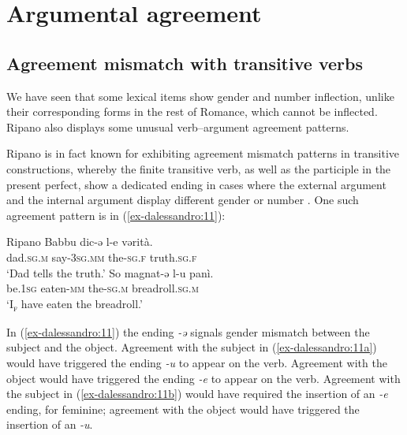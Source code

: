 \documentclass[output=paper
,modfonts
,nonflat]{langsci/langscibook}
\begin{document}
\section{Argumental agreement} \label{sec-dalessandro:2}
\subsection{Agreement mismatch with transitive verbs} \label{sec-dalessandro:2.1}
We have seen that some lexical items show gender and number inflection, unlike their corresponding forms in the rest of Romance, which cannot be inflected. Ripano also displays some unusual verb--argument agreement patterns.

Ripano is in fact known for exhibiting agreement mismatch patterns in transitive constructions, whereby the finite transitive verb, as well as the participle in the present perfect, show a dedicated ending in cases where the external argument and the internal argument display different gender or number \citep{D`Alessandro2017}. One such agreement pattern is in (\ref{ex-dalessandro:11}):

\begin{exe}
	\ex \label{ex-dalessandro:11}Ripano \citep[107]{Mancini1988/1997} \xlist
	\ex \label{ex-dalessandro:11a}
	\gll Babbu dic-ə     l-e     vərità. \\
	dad.\textsc{sg.m} say-\textsc{3sg.mm}     the-\textsc{sg.f}   truth.\textsc{sg.f}\\
	\glt `Dad tells the truth.' 
	\ex \label{ex-dalessandro:11b}
	\gll  So magnat-ə   l-u       panì.\\
	be.\textsc{1sg} eaten-\textsc{mm}\footnotemark {} the-\textsc{sg.m}   breadroll.\textsc{sg.m}\\
	\glt `I\textsc{\textsubscript{f}} have eaten the breadroll.'
	\endxlist
\end{exe}
In (\ref{ex-dalessandro:11}) the ending \textit{-ə} signals gender mismatch between the subject and the object. Agreement with the subject in (\ref{ex-dalessandro:11a}) would have triggered the ending \textit{-u} to appear on the verb. Agreement with the object would have triggered the ending \textit{-e} to appear on the verb. Agreement with the subject in (\ref{ex-dalessandro:11b}) would have required the insertion of an \textit{-e} ending, for feminine; agreement with the object would have triggered the insertion of an \textit{-u}.
\end{document}
